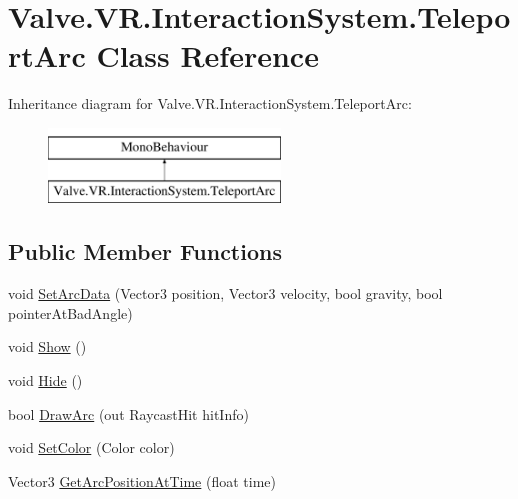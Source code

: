 \hypertarget{class_valve_1_1_v_r_1_1_interaction_system_1_1_teleport_arc}{}\section{Valve.\+V\+R.\+Interaction\+System.\+Teleport\+Arc Class Reference}
\label{class_valve_1_1_v_r_1_1_interaction_system_1_1_teleport_arc}
Inheritance diagram for Valve.\+V\+R.\+Interaction\+System.\+Teleport\+Arc\+:\begin{figure}[H]
\begin{center}
\leavevmode
\includegraphics[height=2.000000cm]{class_valve_1_1_v_r_1_1_interaction_system_1_1_teleport_arc}
\end{center}
\end{figure}
\subsection*{Public Member Functions}
\begin{DoxyCompactItemize}
\item 
void \mbox{\hyperlink{class_valve_1_1_v_r_1_1_interaction_system_1_1_teleport_arc_ac991a684c950f90e2d79fdbc34292b4f}{Set\+Arc\+Data}} (Vector3 position, Vector3 velocity, bool gravity, bool pointer\+At\+Bad\+Angle)
\item 
void \mbox{\hyperlink{class_valve_1_1_v_r_1_1_interaction_system_1_1_teleport_arc_a51ff54c68c4241221b9435ca3fd3c300}{Show}} ()
\item 
void \mbox{\hyperlink{class_valve_1_1_v_r_1_1_interaction_system_1_1_teleport_arc_a11fef135b72459c18fdb5b7aff0c1fa6}{Hide}} ()
\item 
bool \mbox{\hyperlink{class_valve_1_1_v_r_1_1_interaction_system_1_1_teleport_arc_adaa3a493238168dffd0842e6fc46a0ef}{Draw\+Arc}} (out Raycast\+Hit hit\+Info)
\item 
void \mbox{\hyperlink{class_valve_1_1_v_r_1_1_interaction_system_1_1_teleport_arc_ad60be9e28c4b38027bf8f0ac917d6780}{Set\+Color}} (Color color)
\item 
Vector3 \mbox{\hyperlink{class_valve_1_1_v_r_1_1_interaction_system_1_1_teleport_arc_ae10ae65cd32a5c53fd83863964d7c707}{Get\+Arc\+Position\+At\+Time}} (float time)
\end{DoxyCompactItemize}
